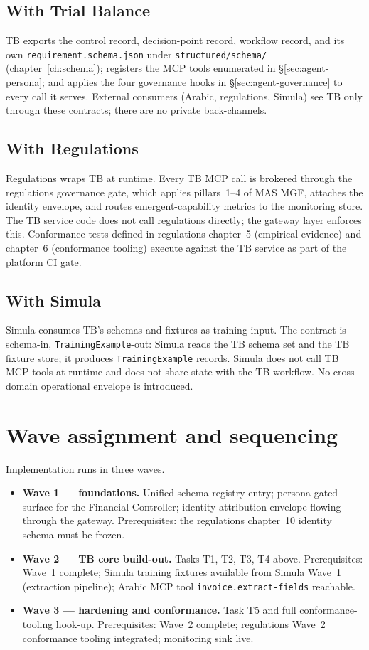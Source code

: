 \documentclass[11pt,a4paper,twoside]{report}
\begin{document}
\subsection{With Trial Balance}
TB exports the control record, decision-point record, workflow
record, and its own \texttt{requirement.schema.json} under
\texttt{structured/schema/} (chapter~\ref{ch:schema}); registers the
MCP tools enumerated in \S\ref{sec:agent-persona}; and applies the
four governance hooks in \S\ref{sec:agent-governance} to every call
it serves. External consumers (Arabic, regulations, Simula) see TB
only through these contracts; there are no private back-channels.

\subsection{With Regulations}
Regulations wraps TB at runtime. Every TB MCP call is brokered
through the regulations governance gate, which applies pillars~1--4
of MAS MGF, attaches the identity envelope, and routes
emergent-capability metrics to the monitoring store. The TB service
code does not call regulations directly; the gateway layer enforces
this. Conformance tests defined in regulations chapter~5 (empirical
evidence) and chapter~6 (conformance tooling) execute against the TB
service as part of the platform CI gate.

\subsection{With Simula}
Simula consumes TB's schemas and fixtures as training input. The
contract is schema-in, \texttt{TrainingExample}-out: Simula reads the
TB schema set and the TB fixture store; it produces
\texttt{TrainingExample} records. Simula does not call TB MCP tools
at runtime and does not share state with the TB workflow. No
cross-domain operational envelope is introduced.

\section{Wave assignment and sequencing}
\label{sec:agent-waves}
Implementation runs in three waves.

\begin{itemize}
\item \textbf{Wave 1 --- foundations.} Unified schema registry
entry; persona-gated surface for the Financial Controller;
identity attribution envelope flowing through the gateway.
Prerequisites: the regulations chapter~10 identity schema must
be frozen.
\item \textbf{Wave 2 --- TB core build-out.} Tasks T1, T2, T3, T4
above. Prerequisites: Wave~1 complete; Simula training fixtures
available from Simula Wave~1 (extraction pipeline); Arabic MCP
tool \texttt{invoice.extract-fields} reachable.
\item \textbf{Wave 3 --- hardening and conformance.} Task T5 and
full conformance-tooling hook-up. Prerequisites: Wave~2 complete;
regulations Wave~2 conformance tooling integrated; monitoring
sink live.
\end{itemize}
\end{document}
